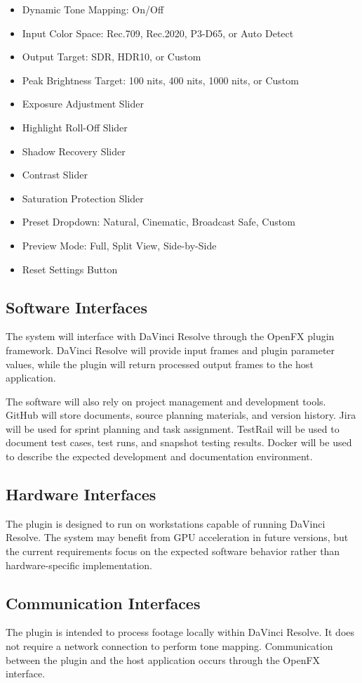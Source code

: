 \documentclass[12pt]{article}
\begin{document}
\begin{itemize}
    \item Dynamic Tone Mapping: On/Off
    \item Input Color Space: Rec.709, Rec.2020, P3-D65, or Auto Detect
    \item Output Target: SDR, HDR10, or Custom
    \item Peak Brightness Target: 100 nits, 400 nits, 1000 nits, or Custom
    \item Exposure Adjustment Slider
    \item Highlight Roll-Off Slider
    \item Shadow Recovery Slider
    \item Contrast Slider
    \item Saturation Protection Slider
    \item Preset Dropdown: Natural, Cinematic, Broadcast Safe, Custom
    \item Preview Mode: Full, Split View, Side-by-Side
    \item Reset Settings Button
\end{itemize}

\subsection{Software Interfaces}
The system will interface with DaVinci Resolve through the OpenFX plugin framework. DaVinci Resolve will provide input frames and plugin parameter values, while the plugin will return processed output frames to the host application.

The software will also rely on project management and development tools. GitHub will store documents, source planning materials, and version history. Jira will be used for sprint planning and task assignment. TestRail will be used to document test cases, test runs, and snapshot testing results. Docker will be used to describe the expected development and documentation environment.

\subsection{Hardware Interfaces}
The plugin is designed to run on workstations capable of running DaVinci Resolve. The system may benefit from GPU acceleration in future versions, but the current requirements focus on the expected software behavior rather than hardware-specific implementation.

\subsection{Communication Interfaces}
The plugin is intended to process footage locally within DaVinci Resolve. It does not require a network connection to perform tone mapping. Communication between the plugin and the host application occurs through the OpenFX interface.
\end{document}
